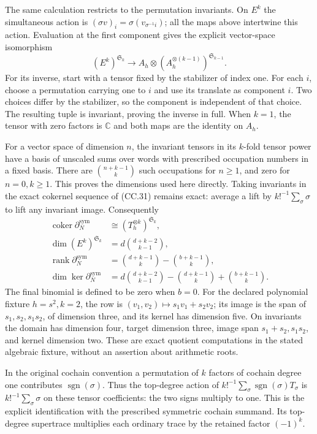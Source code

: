 The same calculation restricts to the permutation invariants.
On \(E^k\) the simultaneous action is
\((\sigma v)_i=\sigma(v_{\sigma^{-1}i})\); all the maps above
intertwine this action.  Evaluation at the first component gives
the explicit vector-space isomorphism
\[
 (E^k)^{\mathfrak S_k}\longrightarrow
 A_h\otimes(A_h^{\otimes(k-1)})^{\mathfrak S_{k-1}}.
 \tag{CC.35}
\]
For its inverse, start with a tensor fixed by the stabilizer of index
one.  For each \(i\), choose a permutation carrying one to \(i\)
and use its translate as component \(i\).  Two choices differ by
the stabilizer, so the component is independent of that choice.
The resulting tuple is invariant, proving the inverse in full.
When \(k=1\), the tensor with zero factors is \(\mathbb C\) and
both maps are the identity on \(A_h\).

For a vector space of dimension \(n\), the invariant tensors in its
\(k\)-fold tensor power have a basis of unscaled sums over words
with prescribed occupation numbers in a fixed basis.  There are
\(\binom{n+k-1}{k}\) such occupations for \(n\ge1\), and zero
for \(n=0,k\ge1\).  This proves the dimensions used here directly.
Taking invariants in the exact cokernel sequence of (CC.31)
remains exact: average a lift by \(k!^{-1}\sum_\sigma\sigma\)
to lift any invariant image.  Consequently
\[
 \begin{aligned}
 \operatorname{coker}\partial_N^{\mathrm{sym}}
      &\cong (T_h^{\otimes k})^{\mathfrak S_k},\\
 \dim(E^k)^{\mathfrak S_k}
      &=d\binom{d+k-2}{k-1},\\
 \operatorname{rank}\partial_N^{\mathrm{sym}}
      &=\binom{d+k-1}{k}-\binom{b+k-1}{k},\\
 \dim\ker\partial_N^{\mathrm{sym}}
      &=d\binom{d+k-2}{k-1}
        -\binom{d+k-1}{k}+\binom{b+k-1}{k}.
 \end{aligned}\tag{CC.36}
\]
The final binomial is defined to be zero when \(b=0\).
For the declared polynomial fixture \(h=s^2,k=2\), the row is
\((v_1,v_2)\mapsto s_1v_1+s_2v_2\); its image is the span of
\(s_1,s_2,s_1s_2\), of dimension three, and its kernel has
dimension five.  On invariants the domain has dimension four,
target dimension three, image span \(s_1+s_2,s_1s_2\), and kernel
dimension two.  These are exact quotient computations in the
stated algebraic fixture, without an assertion about arithmetic roots.

In the original cochain convention a permutation of \(k\) factors
of cochain degree one contributes \(\operatorname{sgn}(\sigma)\).
Thus the top-degree action of
\(k!^{-1}\sum_\sigma\operatorname{sgn}(\sigma)T_\sigma\)
is \(k!^{-1}\sum_\sigma\sigma\) on these tensor coefficients:
the two signs multiply to one.  This is the explicit identification
with the prescribed symmetric cochain summand.  Its top-degree
supertrace multiplies each ordinary trace by the retained factor
\((-1)^k\).

